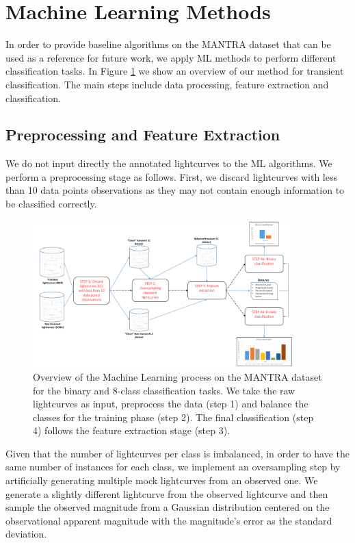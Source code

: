 \documentclass{aastex62}
\begin{document}
\section{Machine Learning Methods} 
\label{sec:ml_tests}
In order to provide baseline algorithms on the MANTRA dataset 
that can be used as a reference for future work, we apply ML methods 
to perform different classification tasks. 
In Figure \ref{fig:ML} we show an overview of our method for transient classification. 
The main steps include data processing, feature extraction and classification.  


\subsection{Preprocessing and Feature Extraction}
We do not input directly the annotated lightcurves to the ML algorithms.
We perform a preprocessing stage as follows. 
First, we discard lightcurves with less than 10 data points observations
as they may not contain enough information to be classified correctly.

\begin{figure}
	\includegraphics[width=0.9\textwidth]{ML.pdf}
  \caption{Overview of the Machine Learning process on the MANTRA dataset for the binary and 8-class classification tasks. We take the raw lightcurves as input, preprocess the data (step 1) and balance the classes for the training phase (step 2). The final classification (step 4) follows the feature extraction stage (step 3).}
  \label{fig:ML}
\end{figure} 


Given that the number of lightcurves per class is imbalanced, 
in order to have the same number of instances for each class, we implement an
oversampling step by artificially generating multiple mock lightcurves 
from an observed one. 
We generate a slightly different lightcurve from the observed lightcurve and 
then sample the observed magnitude from a Gaussian distribution
centered on the observational apparent magnitude with the magnitude's
error as the standard deviation. 
\end{document}
